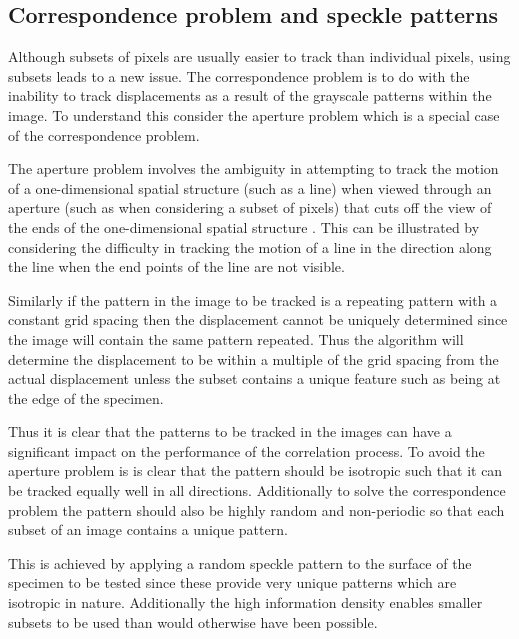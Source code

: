 \subsection{Correspondence problem and speckle patterns}
Although subsets of pixels are usually easier to track than individual pixels, using subsets leads to a new issue. The correspondence problem is to do with the inability to track displacements as a result of the grayscale patterns within the image. To understand this consider the aperture problem which is a special case of the correspondence problem.

The aperture problem involves the ambiguity in attempting to track the motion of a one-dimensional spatial structure (such as a line) when viewed through an aperture (such as when considering a subset of pixels) that cuts off the view of the ends of the one-dimensional spatial structure \cite{apertureProblem}. This can be illustrated by considering the difficulty in tracking the motion of a line in the direction along the line when the end points of the line are not visible. 

Similarly if the pattern in the image to be tracked is a repeating pattern with a constant grid spacing then the displacement cannot be uniquely determined since the image will contain the same pattern repeated. Thus the algorithm will determine the displacement to be within a multiple of the grid spacing from the actual displacement unless the subset contains a unique feature such as being at the edge of the specimen.


Thus it is clear that the patterns to be tracked in the images can have a significant impact on the performance of the correlation process. To avoid the aperture problem is is clear that the pattern should be isotropic such that it can be tracked equally well in all directions. Additionally to solve the correspondence problem the pattern should also be highly random and non-periodic so that each subset of an image contains a unique pattern. 

This is achieved by applying a random speckle pattern to the surface of the specimen to be tested since these provide very unique patterns which are isotropic in nature. Additionally the high information density enables smaller subsets to be used than would otherwise have been possible.


